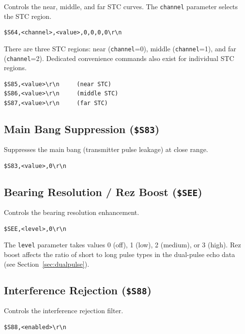 \documentclass[11pt,letterpaper]{article}
\begin{document}
Controls the near, middle, and far STC curves. The \texttt{channel} parameter selects the STC region.

\begin{lstlisting}
$S64,<channel>,<value>,0,0,0,0\r\n
\end{lstlisting}

There are three STC regions: near (\texttt{channel}=0), middle (\texttt{channel}=1), and far (\texttt{channel}=2). Dedicated convenience commands also exist for individual STC regions.

\begin{lstlisting}
$S85,<value>\r\n     (near STC)
$S86,<value>\r\n     (middle STC)
$S87,<value>\r\n     (far STC)
\end{lstlisting}


\subsection{Main Bang Suppression (\texttt{\$S83})}

Suppresses the main bang (transmitter pulse leakage) at close range.

\begin{lstlisting}
$S83,<value>,0\r\n
\end{lstlisting}


\subsection{Bearing Resolution / Rez Boost (\texttt{\$SEE})}

Controls the bearing resolution enhancement.

\begin{lstlisting}
$SEE,<level>,0\r\n
\end{lstlisting}

The \texttt{level} parameter takes values 0 (off), 1 (low), 2 (medium), or 3 (high). Rez boost affects the ratio of short to long pulse types in the dual-pulse echo data (see Section~\ref{sec:dualpulse}).


\subsection{Interference Rejection (\texttt{\$S88})}

Controls the interference rejection filter.

\begin{lstlisting}
$S88,<enabled>\r\n
\end{lstlisting}
\end{document}

